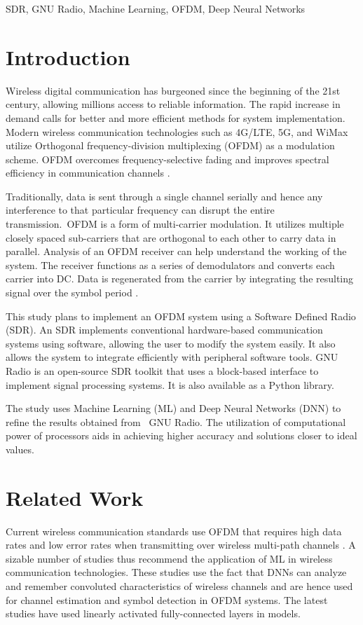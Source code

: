 \documentclass[conference]{IEEEtran}
\begin{document}
\begin{IEEEkeywords}
SDR, GNU Radio, Machine Learning, OFDM, Deep Neural Networks
\end{IEEEkeywords}

\section{Introduction}

Wireless digital communication has burgeoned since the beginning of the 21st century, allowing millions access to reliable information. The rapid increase in demand calls for better and more efficient methods for system implementation. Modern wireless communication technologies such as 4G/LTE, 5G, and WiMax \cite{b1} utilize Orthogonal frequency-division multiplexing (OFDM) as a modulation scheme. OFDM overcomes frequency-selective fading and improves spectral efficiency in communication channels \cite{b2}.


Traditionally, data is sent through a single channel serially and hence any interference to that particular frequency can disrupt the entire transmission. OFDM is a form of multi-carrier modulation. It utilizes multiple closely spaced sub-carriers that are orthogonal to each other to carry data in parallel. Analysis of an OFDM receiver can help understand the working of the system. The receiver functions as a series of demodulators and converts each carrier into DC. Data is regenerated from the carrier by integrating the resulting signal over the symbol period \cite{b3}.

This study plans to implement an OFDM system using a Software Defined Radio (SDR). An SDR implements conventional hardware-based communication systems using software, allowing the user to modify the system easily. It also allows the system to integrate efficiently with peripheral software tools. GNU Radio is an open-source SDR toolkit that uses a block-based interface to implement signal processing systems. It is also available as a Python library.

The study uses Machine Learning (ML) and Deep Neural Networks (DNN) to refine the results obtained from  GNU Radio. The utilization of computational power of processors aids in achieving higher accuracy and solutions closer to ideal values. 

\section{Related Work}
Current wireless communication standards use OFDM that requires high data rates and low error rates when transmitting over wireless multi-path channels \cite{b1}. A sizable number of studies thus recommend the application of ML in wireless communication technologies. These studies use the fact that DNNs can analyze and remember convoluted characteristics of wireless channels and are hence used for channel estimation \cite{b2} and symbol detection \cite{b4} \cite{b5} in OFDM systems. The latest studies have used linearly activated fully-connected layers \cite{b4} in models.
\end{document}

